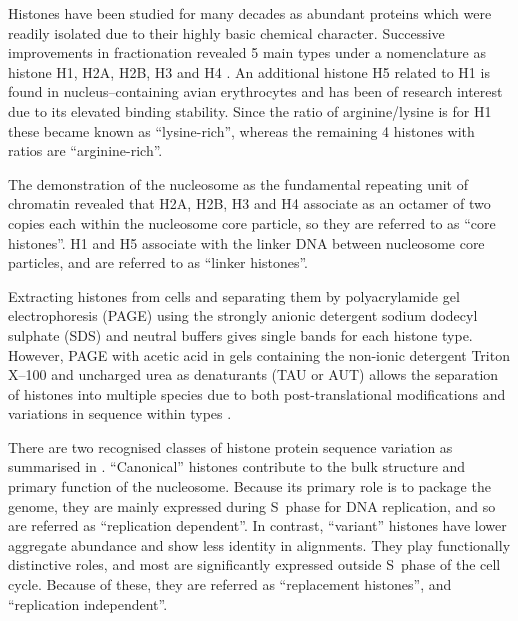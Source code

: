 \documentclass[10pt,a4paper,twocolumn,article]{memoir}
\begin{document}
    Histones have been studied for many decades as abundant proteins which were readily
    isolated due to their highly basic chemical character. Successive improvements in
    fractionation revealed 5 main types under a nomenclature as histone H1, H2A, H2B, H3
    and H4 \citep{nomenclature}. An additional histone H5 related to H1 is found in
    nucleus--containing avian erythrocytes and has been of research interest due to its
    elevated binding stability. Since the ratio of arginine/lysine is \LinkerArgLysRatio{}
    for H1 these became known as ``lysine-rich'', whereas the remaining 4 histones with
    ratios \CoreArgLysRatio{} are ``arginine-rich''.

    The demonstration of the nucleosome as the fundamental repeating unit of chromatin revealed
    that H2A, H2B, H3 and H4 associate as an octamer of two copies each within the
    nucleosome core particle, so they are referred to as ``core histones''. H1 and H5
    associate with the linker DNA between nucleosome core particles, and are referred to
    as ``linker histones''.

    Extracting histones from cells and separating them by polyacrylamide gel electrophoresis
    (PAGE) using the strongly anionic detergent sodium dodecyl sulphate (SDS) and neutral
    buffers gives single bands for each histone type. However, PAGE with acetic acid in gels
    containing the non-ionic detergent Triton X--100 and uncharged urea as denaturants
    (TAU or AUT) allows the separation of histones into multiple species due to both
    post-translational modifications and variations in sequence within types \citep{PAGEND}.

    There are two recognised classes of histone protein sequence variation as summarised
    in . ``Canonical'' histones contribute to the
    bulk structure and primary function of the nucleosome. Because its primary role is to
    package the genome, they are mainly expressed during S~phase for DNA replication,
    and so are referred as ``replication dependent''. In contrast, ``variant'' histones
    have lower aggregate abundance and show less identity in alignments. They play
    functionally distinctive roles, and most are significantly expressed outside S~phase
    of the cell cycle. Because of these, they are referred as ``replacement histones'',
    and ``replication independent''.
\end{document}
